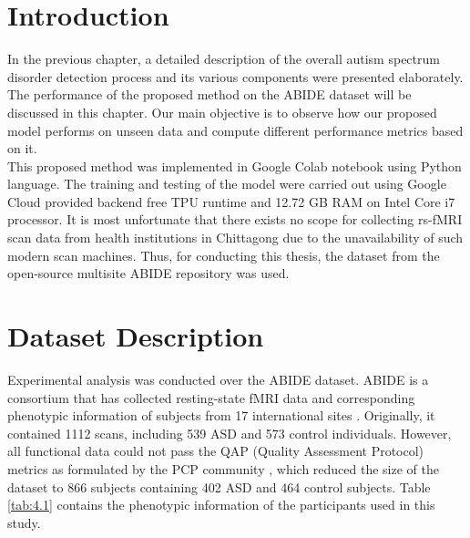 \section{Introduction}
In the previous chapter, a detailed description of the overall autism spectrum disorder
detection process and its various components were presented elaborately. The performance of
the proposed method on the ABIDE dataset will be discussed in this chapter. Our main
objective is to observe how our proposed model performs on unseen data and compute
different performance metrics based on it.\\

This proposed method was implemented in Google Colab notebook using Python language.
The training and testing of the model were carried out using Google Cloud provided backend
free \Gls{TPU} runtime and 12.72 GB RAM on Intel Core i7 processor. It is most unfortunate that
there exists no scope for collecting rs-fMRI scan data from health institutions in Chittagong
due to the unavailability of such modern scan machines. Thus, for conducting this thesis, the
dataset from the open-source multisite ABIDE repository was used.


\section{Dataset Description}
Experimental analysis was conducted over the ABIDE dataset. ABIDE is a consortium that has collected resting-state fMRI data and corresponding phenotypic information of subjects from 17 international sites \cite{di2014autism}. Originally, it contained 1112 scans, including 539 ASD and 573 control individuals. However, all functional data could not pass the QAP (Quality Assessment Protocol) metrics as formulated by the PCP community \cite{abidepreprocessed}, which reduced the size of the dataset to 866 subjects containing 402 ASD and 464 control subjects. Table \ref{tab:4.1} contains the phenotypic information of the participants used in this study.\\

